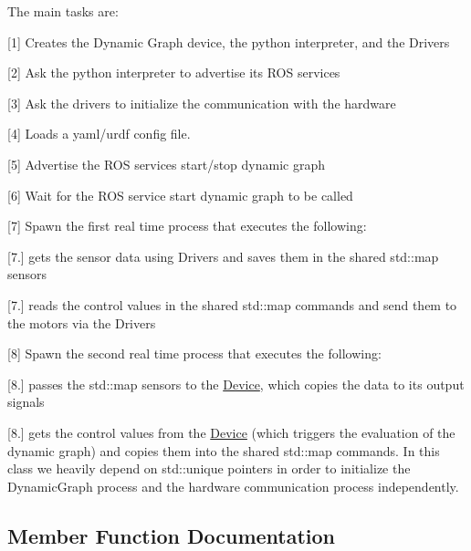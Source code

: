 The main tasks are\+:
\begin{DoxyItemize}
\item \mbox{[}1\mbox{]} Creates the Dynamic Graph device, the python interpreter, and the Drivers
\item \mbox{[}2\mbox{]} Ask the python interpreter to advertise its R\+OS services
\item \mbox{[}3\mbox{]} Ask the drivers to initialize the communication with the hardware
\item \mbox{[}4\mbox{]} Loads a yaml/urdf config file.
\item \mbox{[}5\mbox{]} Advertise the R\+OS services start/stop dynamic graph
\item \mbox{[}6\mbox{]} Wait for the R\+OS service start dynamic graph to be called
\item \mbox{[}7\mbox{]} Spawn the first real time process that executes the following\+:
\begin{DoxyItemize}
\item \mbox{[}7.\mbox{]} gets the sensor data using Drivers and saves them in the shared std\+::map sensors
\item \mbox{[}7.\mbox{]} reads the control values in the shared std\+::map commands and send them to the motors via the Drivers
\end{DoxyItemize}
\item \mbox{[}8\mbox{]} Spawn the second real time process that executes the following\+:
\begin{DoxyItemize}
\item \mbox{[}8.\mbox{]} passes the std\+::map sensors to the \hyperlink{classdynamic__graph_1_1Device}{Device}, which copies the data to its output signals
\item \mbox{[}8.\mbox{]} gets the control values from the \hyperlink{classdynamic__graph_1_1Device}{Device} (which triggers the evaluation of the dynamic graph) and copies them into the shared std\+::map commands. In this class we heavily depend on std\+::unique pointers in order to initialize the Dynamic\+Graph process and the hardware communication process independently. 
\end{DoxyItemize}
\end{DoxyItemize}

\subsection{Member Function Documentation}

